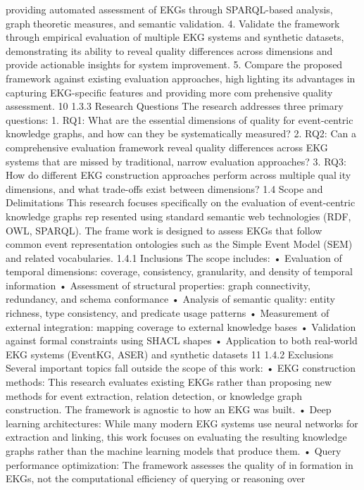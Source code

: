 providing automated assessment of EKGs through SPARQL-based analysis, graphtheoretic measures, and semantic validation.
4. Validate the framework through empirical evaluation of multiple EKG systems
and synthetic datasets, demonstrating its ability to reveal quality differences across
dimensions and provide actionable insights for system improvement.
5. Compare the proposed framework against existing evaluation approaches, highlighting its advantages in capturing EKG-specific features and providing more comprehensive quality assessment.
10
1.3.3 Research Questions
The research addresses three primary questions:
1. RQ1: What are the essential dimensions of quality for event-centric knowledge
graphs, and how can they be systematically measured?
2. RQ2: Can a comprehensive evaluation framework reveal quality differences across
EKG systems that are missed by traditional, narrow evaluation approaches?
3. RQ3: How do different EKG construction approaches perform across multiple quality dimensions, and what trade-offs exist between dimensions?
1.4 Scope and Delimitations
This research focuses specifically on the evaluation of event-centric knowledge graphs represented using standard semantic web technologies (RDF, OWL, SPARQL). The framework is designed to assess EKGs that follow common event representation ontologies such
as the Simple Event Model (SEM) and related vocabularies.
1.4.1 Inclusions
The scope includes:
• Evaluation of temporal dimensions: coverage, consistency, granularity, and density
of temporal information
• Assessment of structural properties: graph connectivity, redundancy, and schema
conformance
• Analysis of semantic quality: entity richness, type consistency, and predicate usage
patterns
• Measurement of external integration: mapping coverage to external knowledge bases
• Validation against formal constraints using SHACL shapes
• Application to both real-world EKG systems (EventKG, ASER) and synthetic
datasets
11
1.4.2 Exclusions
Several important topics fall outside the scope of this work:
• EKG construction methods: This research evaluates existing EKGs rather than
proposing new methods for event extraction, relation detection, or knowledge graph
construction. The framework is agnostic to how an EKG was built.
• Deep learning architectures: While many modern EKG systems use neural
networks for extraction and linking, this work focuses on evaluating the resulting
knowledge graphs rather than the machine learning models that produce them.
• Query performance optimization: The framework assesses the quality of information in EKGs, not the computational efficiency of querying or reasoning over
